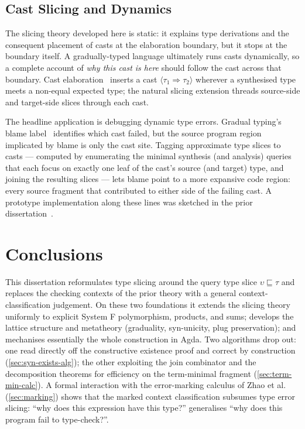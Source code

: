 \subsection{Cast Slicing and Dynamics}
\label{sec:cast-slicing}

The slicing theory developed here is static: it explains type derivations and the consequent placement of casts at the elaboration boundary, but it stops at the boundary itself. A gradually-typed language ultimately runs casts dynamically, so a complete account of \emph{why this cast is here} should follow the cast across that boundary. Cast elaboration~\cite{HazelLivePaper} inserts a cast $\langle\tau_1 \Rightarrow \tau_2\rangle$ wherever a synthesised type meets a non-equal expected type; the natural slicing extension threads source-side and target-side slices through each cast.

The headline application is debugging dynamic type errors. Gradual typing's blame label~\cite{HazelLivePaper} identifies which cast failed, but the source program region implicated by blame is only the cast site. Tagging approximate type slices to casts --- computed by enumerating the minimal synthesis (and analysis) queries that each focus on exactly one leaf of the cast's source (and target) type, and joining the resulting slices --- lets blame point to a more expansive code region: every source fragment that contributed to either side of the failing cast. A prototype implementation along these lines was sketched in the prior dissertation~\cite{Carroll2024}.

\section{Conclusions}
\label{sec:conclusions}

This dissertation reformulates type slicing around the query type slice $\upsilon \sqsubseteq \tau$ and replaces the checking contexts of the prior theory with a general context-classification judgement. On these two foundations it extends the slicing theory uniformly to explicit System F polymorphism, products, and sums; develops the lattice structure and metatheory (graduality, syn-unicity, plug preservation); and mechanises essentially the whole construction in Agda. Two algorithms drop out: one read directly off the constructive existence proof and correct by construction (\cref{sec:syn-exists-alg}); the other exploiting the join combinator and the decomposition theorems for efficiency on the term-minimal fragment (\cref{sec:term-min-calc}). A formal interaction with the error-marking calculus of Zhao et al.~\cite{Marking2024} (\cref{sec:marking}) shows that the marked context classification subsumes type error slicing: ``why does this expression have this type?'' generalises ``why does this program fail to type-check?''.

